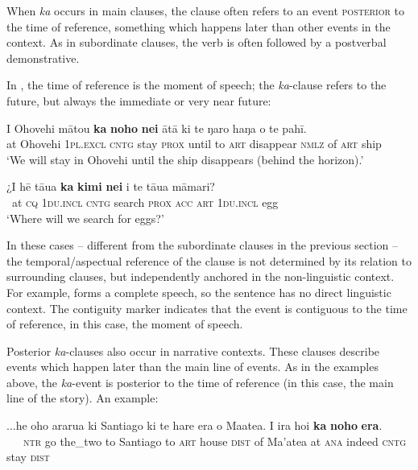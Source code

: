When \textit{ka} occurs in main clauses, the clause often refers to an event \textsc{posterior} to the time of reference, something which happens later than other events in the context. As in subordinate clauses, the verb is often followed by a postverbal demonstrative.

In , the time of reference is the moment of speech; the \textit{ka}{}-clause refers to the future, but always the immediate or very near future:

\ea\label{ex:7.49}
\gll {\ꞌ}I {\ꞌ}Ohovehi mātou \textbf{ka} \textbf{noho} \textbf{nei} {\ꞌ}ātā ki te ŋaro haŋa o te pahī. \\
at Ohovehi \textsc{1pl.excl} \textsc{cntg} stay \textsc{prox} until to \textsc{art} disappear \textsc{nmlz} of \textsc{art} ship \\

\glt 
‘We will stay in Ohovehi until the ship disappears (behind the horizon).’ \textstyleExampleref{[R210.083]} 
\z

\ea\label{ex:7.50}
\gll ¿{\ꞌ}I hē tāua \textbf{ka} \textbf{kimi} \textbf{nei} i te tāua māmari? \\
~at \textsc{cq} \textsc{1du.incl} \textsc{cntg} search \textsc{prox} \textsc{acc} \textsc{art} \textsc{1du.incl} egg \\

\glt
‘Where will we search for eggs?’ \textstyleExampleref{[R245.199]} 
\z

In these cases – different from the subordinate clauses in the previous section – the temporal/aspectual reference of the clause is not determined by its relation to surrounding clauses, but independently anchored in the non-linguistic context. For example,  forms a complete speech, so the sentence has no direct linguistic context. The contiguity marker indicates that the event is contiguous to the time of reference, in this case, the moment of speech.

Posterior \textit{ka}{}-clauses also occur in narrative contexts. These clauses describe events which happen later than the main line of events. As in the examples above, the \textit{ka}{}-event is posterior to the time of reference (in this case, the main line of the story). An example:

\ea\label{ex:7.51}
\gll ...he oho ararua ki Santiago ki te hare era o Ma{\ꞌ}atea. {\ꞌ}I ira ho{\ꞌ}i  \textbf{ka} \textbf{noho} \textbf{era}.\\
~~~\textsc{ntr} go the\_two to Santiago to \textsc{art} house \textsc{dist} of Ma’atea at \textsc{ana} indeed  \textsc{cntg} stay \textsc{dist}\\

